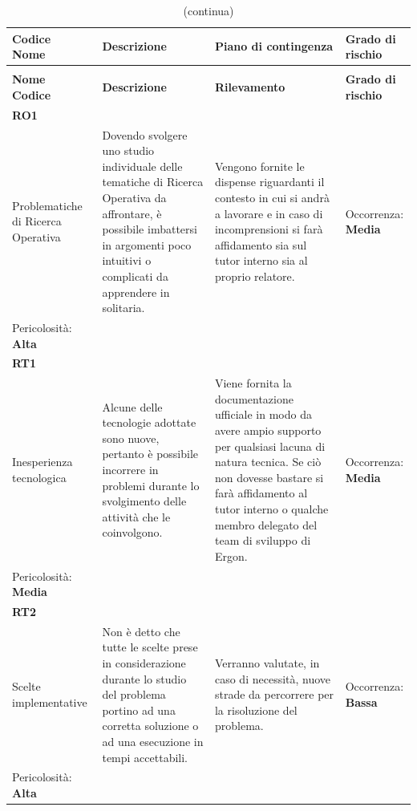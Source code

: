 \renewcommand{\arraystretch}{1.5}
\begin{longtable}{ 
		>{\centering}p{} 
		>{\raggedright}p{}
		>{\raggedright}p{} 
		>{\centering}p{}
	}
	
	\caption{Tabella dei rischi di progetto}\\
	\rowcolorhead
	\textbf{Codice \\ Nome} & \centering{}\textbf{Descrizione} & 
	\centering{}\textbf{Piano di contingenza} & 
	\textbf{Grado di rischio} 
	\tabularnewline
	\endfirsthead
	\rowcolor{white}\caption[]{(continua)}\\
	\rowcolorhead
	\textbf{Nome \\ Codice} & \centering{}\textbf{Descrizione} & 
	\centering{}\textbf{Rilevamento} & 
	\textbf{Grado di rischio} 
	\tabularnewline
	\endhead
	
	\rowcolordark \textbf{RO1} \\ Problematiche di Ricerca Operativa & 
	Dovendo svolgere uno studio individuale delle tematiche di Ricerca Operativa da affrontare, è possibile imbattersi in argomenti poco intuitivi o complicati da apprendere in solitaria. &
	Vengono fornite le dispense riguardanti il contesto in cui si andrà a lavorare e in caso di incomprensioni si farà affidamento sia sul tutor interno sia al proprio relatore. &
	Occorrenza: \textbf{Media} \\
	Pericolosità: \textbf{Alta} 
	\tabularnewline
	
	\rowcolorlight \textbf{RT1} \\ Inesperienza tecnologica & 
	Alcune delle tecnologie adottate sono nuove, pertanto è possibile incorrere in problemi durante lo svolgimento delle attività che le coinvolgono. &
	Viene fornita la documentazione ufficiale in modo da avere ampio supporto per qualsiasi lacuna di natura tecnica. Se ciò non dovesse bastare si farà affidamento al tutor interno o qualche membro delegato del team di sviluppo di Ergon. &
	Occorrenza: \textbf{Media} \\
	Pericolosità: \textbf{Media} 
	\tabularnewline

	\rowcolordark \textbf{RT2} \\ Scelte implementative & 
	Non è detto che tutte le scelte prese in considerazione durante lo studio del problema portino ad una corretta soluzione o ad una esecuzione in tempi accettabili. &
	Verranno valutate, in caso di necessità, nuove strade da percorrere per la risoluzione del problema. &
	Occorrenza: \textbf{Bassa} \\
	Pericolosità: \textbf{Alta} 
	\tabularnewline
	
	
\end{longtable}
	
\renewcommand{\arraystretch}{1}